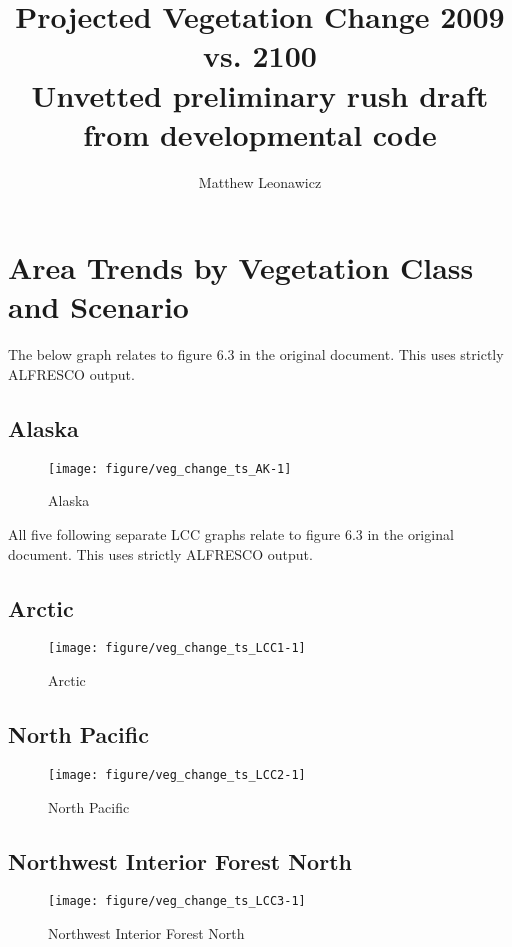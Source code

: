 \documentclass{article}\usepackage[]{graphicx}\usepackage[]{color}
\makeatletter
\def\maxwidth{ %
  \ifdim\Gin@nat@width>\linewidth
    \linewidth
  \else
    \Gin@nat@width
  \fi
}
\makeatother
\begin{document}
\title{Projected Vegetation Change 2009 vs. 2100 \\ \large Unvetted preliminary rush draft from developmental code}
\author{Matthew Leonawicz}
\maketitle

\setlength{\aboverulesep}{0.2pt}
\setlength{\belowrulesep}{0.2pt}





\section{Area Trends by Vegetation Class and Scenario}
The below graph relates to figure 6.3 in the original document.
This uses strictly ALFRESCO output.
\subsection{Alaska}
\begin{figure}[H]
\texttt{[image: figure/veg\_change\_ts\_AK-1]} \caption[Alaska]{Alaska\label{fig:veg_change_ts_AK}}
\end{figure}



All five following separate LCC graphs relate to figure 6.3 in the original document.
This uses strictly ALFRESCO output.
\subsection{Arctic}
\begin{figure}[H]
\texttt{[image: figure/veg\_change\_ts\_LCC1-1]} \caption[Arctic]{Arctic\label{fig:veg_change_ts_LCC1}}
\end{figure}



\subsection{North Pacific}
\begin{figure}[H]
\texttt{[image: figure/veg\_change\_ts\_LCC2-1]} \caption[North Pacific]{North Pacific\label{fig:veg_change_ts_LCC2}}
\end{figure}



\subsection{Northwest Interior Forest North}
\begin{figure}[H]
\texttt{[image: figure/veg\_change\_ts\_LCC3-1]} \caption[Northwest Interior Forest North]{Northwest Interior Forest North\label{fig:veg_change_ts_LCC3}}
\end{figure}
\end{document}
